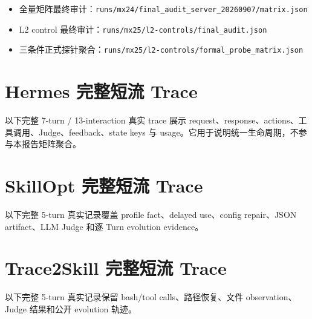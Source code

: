 \documentclass[11pt,a4paper]{article}
\newcommand{\code}[1]{\texttt{#1}}
\begin{document}
\begin{itemize}
  \item 全量矩阵最终审计：\code{runs/mx24/final\_audit\_server\_20260907/matrix.json}
  \item L2 control 最终审计：\code{runs/mx25/l2-controls/final\_audit.json}
  \item 三条件正式探针聚合：\code{runs/mx25/l2-controls/formal\_probe\_matrix.json}
\end{itemize}

\clearpage
\appendix
\section{Hermes 完整短流 Trace}

以下完整 7-turn / 13-interaction 真实 trace 展示 request、response、actions、工具调用、Judge、feedback、state keys 与 usage。它用于说明统一生命周期，不参与本报告矩阵聚合。



\clearpage
\section{SkillOpt 完整短流 Trace}

以下完整 5-turn 真实记录覆盖 profile fact、delayed use、config repair、JSON artifact、LLM Judge 和逐 Turn evolution evidence。



\clearpage
\section{Trace2Skill 完整短流 Trace}

以下完整 5-turn 真实记录保留 bash/tool calls、路径恢复、文件 observation、Judge 结果和公开 evolution 轨迹。


\end{document}
